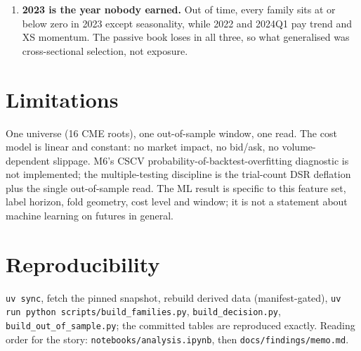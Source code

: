 \documentclass[11pt,a4paper]{article}
\begin{document}
\begin{enumerate}
daily, and that sign moves with the front leg's own price. Holding the identical signal from each
month's first session earns $+0.163$ where the daily refresh earns $-3.614$, and inverting the daily
rule earns $+2.807$ (\texttt{results/out\_of\_sample/carry\_frequency.csv}). The sign convention is \emph{not}
resolved by adopting the profitable direction, and the carry premium is neither confirmed nor refuted
by these numbers.
\item \textbf{2023 is the year nobody earned.} Out of time, every family sits at or below zero in 2023
except seasonality, while 2022 and 2024Q1 pay trend and XS momentum. The passive book loses in all
three, so what generalised was cross-sectional selection, not exposure.
\end{enumerate}

\section{Limitations}
One universe (16 CME roots), one out-of-sample window, one read. The cost model is linear and
constant: no market impact, no bid/ask, no volume-dependent slippage. M6's CSCV
probability-of-backtest-overfitting diagnostic is not implemented; the multiple-testing discipline is
the trial-count DSR deflation plus the single out-of-sample read. The ML result is specific to this
feature set, label horizon, fold geometry, cost level and window; it is not a statement about
machine learning on futures in general.

\section*{Reproducibility}
\texttt{uv sync}, fetch the pinned snapshot, rebuild derived data (manifest-gated),
\texttt{uv run python scripts/build\_families.py}, \texttt{build\_decision.py},
\texttt{build\_out\_of\_sample.py}; the committed tables are reproduced exactly. Reading order for the
story: \texttt{notebooks/analysis.ipynb}, then \texttt{docs/findings/memo.md}.
\end{document}
